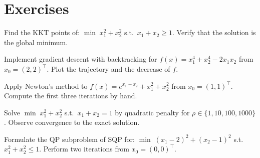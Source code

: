 \section{Exercises}

\begin{exercise}
Find the KKT points of: $\min\; x_1^2 + x_2^2$ s.t.\ $x_1 + x_2 \geq 1$.
Verify that the solution is the global minimum.
\end{exercise}

\begin{exercise}
Implement gradient descent with backtracking for
$f(x) = x_1^4 + x_2^4 - 2x_1 x_2$ from $x_0 = (2, 2)^\top$. Plot the
trajectory and the decrease of $f$.
\end{exercise}

\begin{exercise}
Apply Newton's method to $f(x) = e^{x_1 + x_2} + x_1^2 + x_2^2$ from
$x_0 = (1, 1)^\top$. Compute the first three iterations by hand.
\end{exercise}

\begin{exercise}
Solve $\min\; x_1^2 + x_2^2$ s.t.\ $x_1 + x_2 = 1$ by quadratic penalty
for $\rho \in \{1, 10, 100, 1000\}$. Observe convergence to the exact
solution.
\end{exercise}

\begin{exercise}
Formulate the QP subproblem of SQP for:
$\min\; (x_1 - 2)^2 + (x_2 - 1)^2$ s.t.\ $x_1^2 + x_2^2 \leq 1$.
Perform two iterations from $x_0 = (0, 0)^\top$.
\end{exercise}
